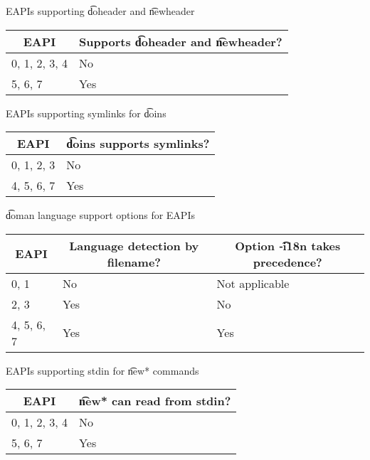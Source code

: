 \begin{centertable}{EAPIs supporting \t{doheader} and \t{newheader}}
    \label{tab:doheader-table}
    \begin{tabular}{ll}
      \toprule
      \multicolumn{1}{c}{\textbf{EAPI}} &
      \multicolumn{1}{c}{\textbf{Supports \t{doheader} and \t{newheader}?}} \\
      \midrule
      0, 1, 2, 3, 4     & No  \\
      5, 6, 7           & Yes \\
      \bottomrule
    \end{tabular}
\end{centertable}

\begin{centertable}{EAPIs supporting symlinks for \t{doins}}
    \label{tab:doins-table}
    \begin{tabular}{ll}
      \toprule
      \multicolumn{1}{c}{\textbf{EAPI}} &
      \multicolumn{1}{c}{\textbf{\t{doins} supports symlinks?}} \\
      \midrule
      0, 1, 2, 3        & No  \\
      4, 5, 6, 7        & Yes \\
      \bottomrule
    \end{tabular}
\end{centertable}

\begin{centertable}{\t{doman} language support options for EAPIs}
    \label{tab:doman-table}
    \begin{tabular}{lll}
      \toprule
      \multicolumn{1}{c}{\textbf{EAPI}} &
      \multicolumn{1}{c}{\textbf{Language detection by filename?}} &
      \multicolumn{1}{c}{\textbf{Option \t{-i18n} takes precedence?}} \\
      \midrule
      0, 1              & No  & Not applicable \\
      2, 3              & Yes & No             \\
      4, 5, 6, 7        & Yes & Yes            \\
      \bottomrule
    \end{tabular}
\end{centertable}

\begin{centertable}{EAPIs supporting stdin for \t{new*} commands}
    \label{tab:newfoo-stdin-table}
    \begin{tabular}{ll}
      \toprule
      \multicolumn{1}{c}{\textbf{EAPI}} &
      \multicolumn{1}{c}{\textbf{\t{new*} can read from stdin?}} \\
      \midrule
      0, 1, 2, 3, 4     & No  \\
      5, 6, 7           & Yes \\
      \bottomrule
    \end{tabular}
\end{centertable}

